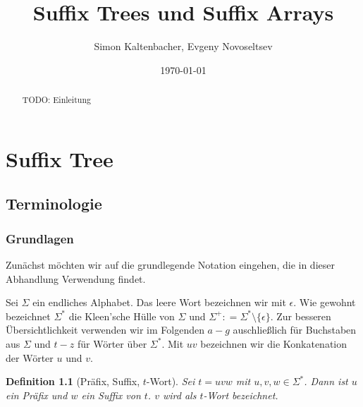 \documentclass[12pt]{report}
\title{Suffix Trees und Suffix Arrays}
\author{Simon Kaltenbacher, Evgeny Novoseltsev}
\date{\today}
\newtheorem{definition}{Definition}
\newcommand{\coloneqq}{\mathrel{\mathop:}=}
\begin{document}
\maketitle

\tableofcontents

\begin{abstract}
TODO: Einleitung
\end{abstract}

\chapter{Suffix Tree}
\label{chap:SuffixTree}

\section{Terminologie}
\label{sec:SuffixTreeTerminologie}

\subsection{Grundlagen}
\label{sec:Grundlagen}

Zunächst möchten wir auf die grundlegende Notation eingehen, die in dieser Abhandlung Verwendung findet.

Sei $\Sigma$ ein endliches Alphabet. Das leere Wort bezeichnen wir mit $\epsilon$. Wie gewohnt bezeichnet $\Sigma^*$ die Kleen'sche Hülle von $\Sigma$ und $\Sigma^+ \coloneqq \Sigma^* \setminus \{\epsilon\}$. Zur besseren Übersichtlichkeit verwenden wir im Folgenden $a - g$ auschließlich für Buchstaben aus $\Sigma$ und $t - z$ für Wörter über $\Sigma^*$. Mit $uv$ bezeichnen wir die Konkatenation der Wörter $u$ und $v$.

\begin{definition}[Präfix, Suffix, $t$-Wort]
Sei $t = uvw$ mit $u, v, w \in \Sigma^*$. Dann ist $u$ ein Präfix und $w$ ein Suffix von $t$. $v$ wird als $t$-Wort bezeichnet.
\end{definition}
\end{document}
